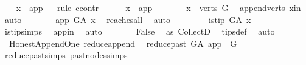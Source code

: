 \begin{isabellebody}
\ \ \isamarkupfalse%
\ {\isachardoublequoteopen}x\ {\isacharequal}{\kern0pt}\ app{\isachardoublequoteclose}\isanewline
\ \ \isamarkupfalse%
{\isacharparenleft}{\kern0pt}rule\ ccontr{\isacharparenright}{\kern0pt}\isanewline
\ \ \ \ \isamarkupfalse%
\ {\isachardoublequoteopen}x\ {\isasymnoteq}\ app{\isachardoublequoteclose}\isanewline
\ \ \ \ \isamarkupfalse%
\ \isamarkupfalse%
\ {\isachardoublequoteopen}x\ {\isasymin}\ verts\ G{\isachardoublequoteclose}\ \isamarkupfalse%
\ append{\isacharunderscore}{\kern0pt}verts\ x{\isacharunderscore}{\kern0pt}in\ \isamarkupfalse%
\ auto\isanewline
\ \ \ \ \isamarkupfalse%
\ \isamarkupfalse%
\ {\isachardoublequoteopen}app\ {\isasymrightarrow}\isactrlsup {\isacharplus}{\kern0pt}\isactrlbsub G{\isacharunderscore}{\kern0pt}A\isactrlesub \ x{\isachardoublequoteclose}\ \isamarkupfalse%
\ reaches{\isacharunderscore}{\kern0pt}all\ \isamarkupfalse%
\ auto\isanewline
\ \ \ \ \isamarkupfalse%
\ \isamarkupfalse%
\ {\isachardoublequoteopen}{\isasymnot}\ is{\isacharunderscore}{\kern0pt}tip\ G{\isacharunderscore}{\kern0pt}A\ x{\isachardoublequoteclose}\ \ \isamarkupfalse%
\ is{\isacharunderscore}{\kern0pt}tip{\isachardot}{\kern0pt}simps\ \isamarkupfalse%
\ app{\isacharunderscore}{\kern0pt}in\ \isamarkupfalse%
\ auto\isanewline
\ \ \ \ \isamarkupfalse%
\ \isamarkupfalse%
\ {\isachardoublequoteopen}False{\isachardoublequoteclose}\ \isamarkupfalse%
\ as{}\ CollectD\ \isamarkupfalse%
\ tips{\isacharunderscore}{\kern0pt}def\ \isamarkupfalse%
\ auto\isanewline
\ \ \isamarkupfalse%
\isanewline
{}\isamarkupfalse%
%
\endisatagproof
{\isafoldproof}%
%
\isadelimproof
\isanewline
%
\endisadelimproof
\isanewline
{}\isamarkupfalse%
\ {\isacharparenleft}{\kern0pt}\ Honest{\isacharunderscore}{\kern0pt}Append{\isacharunderscore}{\kern0pt}One{\isacharparenright}{\kern0pt}\ reduce{\isacharunderscore}{\kern0pt}append{\isacharcolon}{\kern0pt}\isanewline
\ \ {\isachardoublequoteopen}reduce{\isacharunderscore}{\kern0pt}past\ G{\isacharunderscore}{\kern0pt}A\ app\ {\isacharequal}{\kern0pt}\ G{\isachardoublequoteclose}\isanewline
%
\isadelimproof
\ \ %
\endisadelimproof
%
\isatagproof
{}\isamarkupfalse%
\ reduce{\isacharunderscore}{\kern0pt}past{\isachardot}{\kern0pt}simps\ past{\isacharunderscore}{\kern0pt}nodes{\isachardot}{\kern0pt}simps\ \isanewline

\end{isabellebody}
